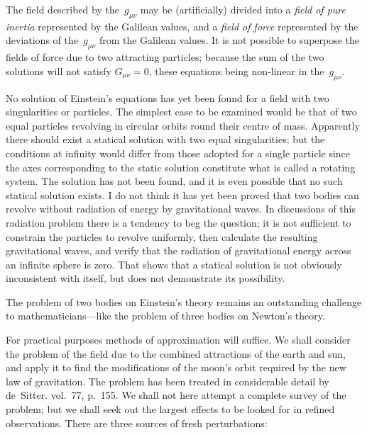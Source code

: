 \documentclass[12pt]{book}
\begin{document}
%
%
%

The field described by the~$g_{\mu\nu}$ may be (artificially) divided into a \emph{field of
pure inertia} represented by the Galilean values, and a \emph{field of force} represented
by the deviations of the~$g_{\mu\nu}$ from the Galilean values. It is not possible
to superpose the fields of force due to two attracting particles; because the
sum of the two solutions will not satisfy $G_{\mu\nu} = 0$, these equations being non\hyp{}linear
in the~$g_{\mu\nu}$.

No solution of Einstein's equations has yet been found for a field with two
singularities or particles. The simplest case to be examined would be that of
two equal particles revolving in circular orbits round their centre of mass.
Apparently there should exist a statical solution with two equal singularities;
but the conditions at infinity would differ from those adopted for a single
particle since the axes corresponding to the static solution constitute what is
called a rotating system. The solution has not been found, and it is even
possible that no such statical solution exists. I do not think it has yet been
proved that two bodies can revolve without radiation of energy by gravitational
waves. In discussions of this radiation problem there is a tendency to beg the
question; it is not sufficient to constrain the particles to revolve uniformly,
then calculate the resulting gravitational waves, and verify that the radiation
of gravitational energy across an infinite sphere is zero. That shows that a
statical solution is not obviously inconsistent with itself, but does not demonstrate
its possibility.

The problem of two bodies on Einstein's theory remains an outstanding
challenge to mathematicians---like the problem of three bodies on Newton's
theory.

For practical purposes methods of approximation will suffice. We shall
consider the problem of the field due to the combined attractions of the earth
and sun, and apply it to find the modifications of the moon's orbit required by
the new law of gravitation. The problem has been treated in considerable
detail by de~Sitter\footnotemark.\footnotetext
  { vol.~77, p.~155.}
We shall not here attempt a complete survey of the
problem; but we shall seek out the largest effects to be looked for in refined
observations. There are three sources of fresh perturbations:
\end{document}
